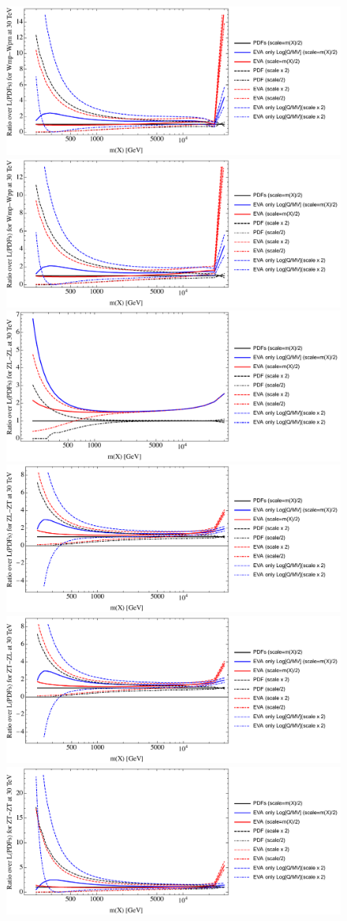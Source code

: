 \documentclass[a4paper,11pt]{article}
\begin{document}
\begin{figure}[ht]
\includegraphics[width=0.46\linewidth]{PlotLumi/30TeV/ratios/Wmp-Wpm.pdf}
\includegraphics[width=0.46\linewidth]{PlotLumi/30TeV/ratios/Wmp-Wpp.pdf}
\includegraphics[width=0.46\linewidth]{PlotLumi/30TeV/ratios/ZL-ZL.pdf}
\includegraphics[width=0.46\linewidth]{PlotLumi/30TeV/ratios/ZL-ZT.pdf}
\includegraphics[width=0.46\linewidth]{PlotLumi/30TeV/ratios/ZT-ZL.pdf}
\includegraphics[width=0.46\linewidth]{PlotLumi/30TeV/ratios/ZT-ZT.pdf}
\end{figure}
\end{document}
